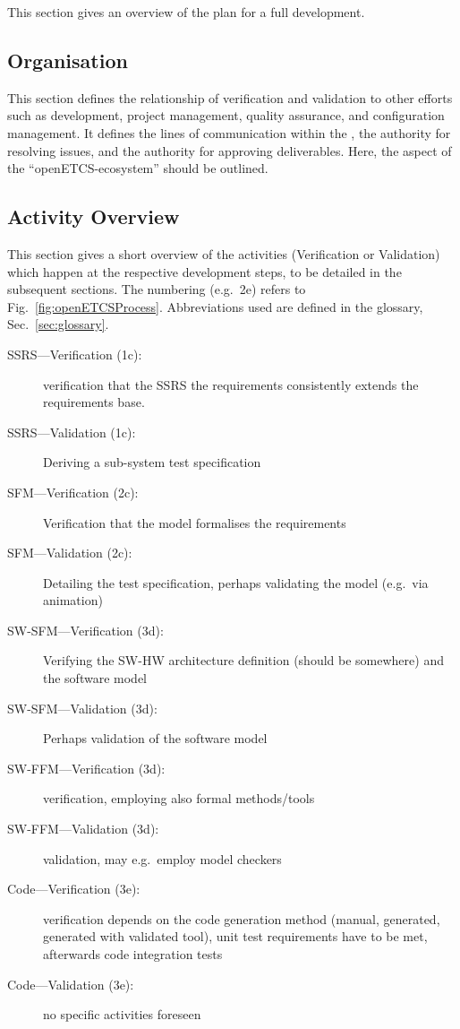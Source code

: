 This section gives an overview of the \vv plan for a full development. 

\subsection{\VV Organisation}
\label{sec:vv-organisation}

This section defines the relationship of verification and validation
to other efforts such as development, project management, quality
assurance, and configuration management. It defines the lines of
communication within the \vv, the authority for resolving issues, and
the authority for approving \vv deliverables. Here, the \vv aspect of
the ``openETCS-ecosystem'' should be outlined.



\subsection{\VV Activity Overview}
\label{sec:vv-activity-overview}

This section gives a short overview of the activities (Verification or
Validation) which happen at the respective development steps, to be
detailed in the subsequent sections. The numbering (e.g.\ 2e) refers
to Fig.~\ref{fig:openETCSProcess}. Abbreviations used are defined in
the glossary, Sec.~\ref{sec:glossary}.

\begin{description}
\item[SSRS---Verification (1c):] verification that the SSRS the requirements
  consistently extends the requirements base. 
\item[SSRS---Validation (1c):] Deriving a sub-system test specification
\item[SFM---Verification (2c):] Verification that the model formalises
  the requirements
\item[SFM---Validation (2c):] Detailing the test specification,
  perhaps validating the model (e.g.\ via animation)
\item[SW-SFM---Verification (3d):] Verifying the SW-HW architecture
  definition (should be somewhere) and the software model
\item[SW-SFM---Validation (3d):]Perhaps validation of the software model
\item[SW-FFM---Verification (3d):]  verification, employing also
  formal methods/tools 
\item[SW-FFM---Validation (3d):] validation, may e.g.\ employ model checkers
\item[Code---Verification (3e):] verification depends on the code
  generation method (manual, generated, generated with validated
  tool), unit test requirements have to be met, afterwards code
  integration tests
\item[Code---Validation (3e):] no specific activities foreseen
\end{description}

